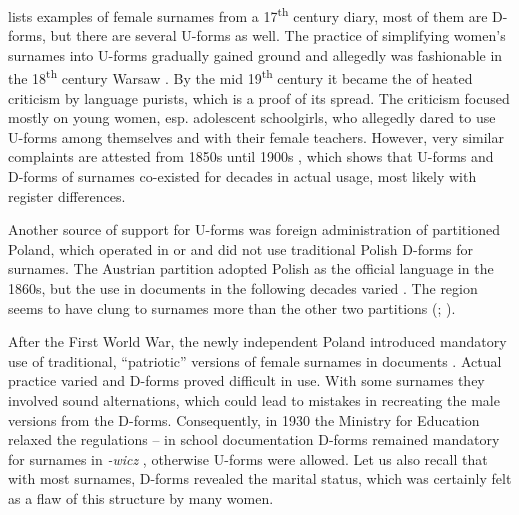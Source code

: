 \documentclass[output=paper,colorlinks,citecolor=brown]{langscibook}
\begin{document}
\citet[63]{kucala1978} lists examples of female surnames from a 17\textsuperscript{th} century diary, most of them are D-forms, but there are several U-forms as well. The practice of simplifying women's surnames into U-forms gradually gained ground and allegedly was fashionable in the 18\textsuperscript{th} century Warsaw \citep[63]{nitsch1951}. By the mid 19\textsuperscript{th} century it became the  of heated criticism by language purists, which is a proof of its spread. The criticism focused mostly on young women, esp. adolescent schoolgirls, who allegedly dared to use U-forms among themselves and with their female teachers. However, very similar complaints are attested from 1850s until 1900s \citep[50]{pawlowski1951}, which shows that U-forms and D-forms of surnames co-existed for decades in actual usage, most likely with register differences.

Another source of support for U-forms was foreign administration of partitioned Poland, which operated in  or  and did not use traditional Polish D-forms for surnames. The Austrian partition adopted Polish as the official language in the 1860s, but the use in documents in the following decades varied \citep{kowalska2013}. The region seems to have clung to  surnames more than the other two partitions (\citealt[63]{nitsch1951}; \citealt[56]{pawlowski1951}).

After the First World War, the newly independent Poland introduced mandatory use of traditional, ``patriotic''  versions of female surnames in documents \citep{dacewicz2021}. Actual practice varied and D-forms proved difficult in use. With some surnames they involved sound alternations, which could lead to mistakes in recreating the male versions from the D-forms. Consequently, in 1930 the Ministry for Education relaxed the regulations -- in school documentation D-forms remained mandatory for surnames in \emph{-wicz} \citep[54]{pawlowski1951}, otherwise U-forms were allowed. Let us also recall that with most surnames, D-forms revealed the marital status, which was certainly felt as a flaw of this structure by many women.
\end{document}
